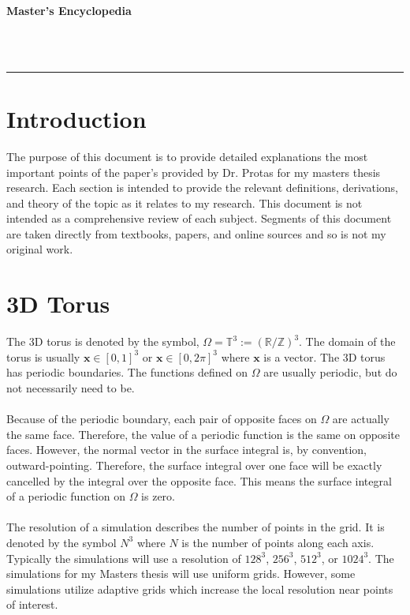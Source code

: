 \documentclass[12pt]{article}
\begin{document}
\begin{center}
\begin{huge}
\textbf{Master's Encyclopedia}
\end{huge}
\\~\\
\noindent\rule{16.5cm}{0.4pt}
\end{center}

\begin{flushleft}

\section{Introduction}
\qquad The purpose of this document is to provide detailed explanations the most important points of the paper's provided by Dr. Protas for my masters thesis research. Each section is intended to provide the relevant definitions, derivations, and theory of the topic as it relates to my research. This document is not intended as a comprehensive review of each subject. Segments of this document are taken directly from textbooks, papers, and online sources and so is not my original work.

\section{3D Torus}
\qquad The 3D torus is denoted by the symbol, $\Omega = \mathbb{T}^3 := (\mathbb{R}/\mathbb{Z})^3$. The domain of the torus is usually $\boldsymbol x\in [0,1]^3$ or $\boldsymbol x\in [0,2\pi]^3$ where $\boldsymbol x$ is a vector. The 3D torus has periodic boundaries. The functions defined on $\Omega$ are usually periodic, but do not necessarily need to be.
\\~\\
\qquad Because of the periodic boundary, each pair of opposite faces on $\Omega$ are actually the same face. Therefore, the value of a periodic function is the same on opposite faces. However, the normal vector in the surface integral is, by convention, outward-pointing. Therefore, the surface integral over one face will be exactly cancelled by the integral over the opposite face. This means the surface integral of a periodic function on $\Omega$ is zero.
\\~\\
\qquad The resolution of a simulation describes the number of points in the grid. It is denoted by the symbol $N^3$ where $N$ is the number of points along each axis. Typically the simulations will use a resolution of $128^3$, $256^3$, $512^3$, or $1024^3$. The simulations for my Masters thesis will use uniform grids. However, some simulations utilize adaptive grids which increase the local resolution near points of interest.


\end{flushleft}
\end{document}
